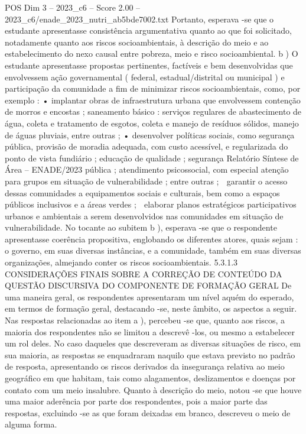\begin{textsample}{POS Dim 3 – 2023\_c6 – Score 2.00 – 2023\_c6/enade\_2023\_nutri\_ab5bde7002.txt}
Portanto, esperava -se que o estudante apresentasse consistência argumentativa quanto ao que foi solicitado, notadamente quanto aos riscos socioambientais, à descrição do meio e ao estabelecimento do nexo causal entre pobreza, meio e risco socioambiental. b ) O estudante apresentasse propostas pertinentes, factíveis e bem desenvolvidas que envolvessem ação governamental ( federal, estadual/distrital ou municipal ) e participação da comunidade a fim de minimizar riscos socioambientais, como, por exemplo : • implantar obras de infraestrutura urbana que envolvessem contenção de morros e encostas ; saneamento básico : serviços regulares de abastecimento de água, coleta e tratamento de esgotos, coleta e manejo de resíduos sólidos, manejo de águas pluviais, entre outras ; • desenvolver políticas sociais, como segurança pública, provisão de moradia adequada, com custo acessível, e regularizada do ponto de vista fundiário ; educação de qualidade ; segurança Relatório Síntese de Área – ENADE/2023 pública ; atendimento psicossocial, com especial atenção para grupos em situação de vulnerabilidade ; entre outras ;  garantir o acesso dessas comunidades a equipamentos sociais e culturais, bem como a espaços públicos inclusivos e a áreas verdes ;  elaborar planos estratégicos participativos urbanos e ambientais a serem desenvolvidos nas comunidades em situação de vulnerabilidade.
No tocante ao subitem b ), esperava -se que o respondente apresentasse coerência propositiva, englobando os diferentes atores, quais sejam : o governo, em suas diversas instâncias, e a comunidade, também em suas diversas organizações, almejando conter os riscos socioambientais. 5.3.1.3 CONSIDERAÇÕES FINAIS SOBRE A CORREÇÃO DE CONTEÚDO DA QUESTÃO DISCURSIVA DO COMPONENTE DE FORMAÇÃO GERAL De uma maneira geral, os respondentes apresentaram um nível aquém do esperado, em termos de formação geral, destacando -se, neste âmbito, os aspectos a seguir.
Nas respostas relacionadas ao item a ), percebeu -se que, quanto aos riscos, a maioria dos respondentes não se limitou a descrevê -los, ou mesmo a estabelecer um rol deles.
No caso daqueles que descreveram as diversas situações de risco, em sua maioria, as respostas se enquadraram naquilo que estava previsto no padrão de resposta, apresentando os riscos derivados da insegurança relativa ao meio geográfico em que habitam, tais como alagamentos, deslizamentos e doenças por contato com um meio insalubre.
Quanto à descrição do meio, notou -se que houve uma maior aderência por parte dos respondentes, pois a maior parte das respostas, excluindo -se as que foram deixadas em branco, descreveu o meio de alguma forma.

\end{textsample}
